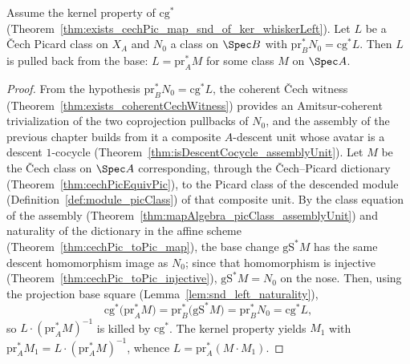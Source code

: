 \begin{theorem}
  \label{thm:exists_cechPic_map_snd_eq_of_ker}
  \leanok
  Assume the kernel property of \(\mathrm{cg}^{*}\) (Theorem~\ref{thm:exists_cechPic_map_snd_of_ker_whiskerLeft}).
  Let \(L\) be a \v Cech Picard class on \(X_A\) and \(N_0\) a class on \(\Spec B\) with
  \(\mathrm{pr}_B^{*} N_0 = \mathrm{cg}^{*} L\).  Then \(L\) is pulled back from the base:
  \(L = \mathrm{pr}_A^{*} M\) for some class \(M\) on \(\Spec A\).
\end{theorem}
\begin{proof}
  \leanok
  From the hypothesis \(\mathrm{pr}_B^{*} N_0 = \mathrm{cg}^{*} L\), the coherent \v Cech witness
  (Theorem~\ref{thm:exists_coherentCechWitness}) provides an Amitsur-coherent trivialization of
  the two coprojection pullbacks of \(N_0\), and the assembly of the previous chapter builds from
  it a composite \(A\)-descent unit whose avatar is a descent \(1\)-cocycle
  (Theorem~\ref{thm:isDescentCocycle_assemblyUnit}).  Let \(M\) be the \v Cech class on \(\Spec
  A\) corresponding, through the \v Cech–Picard dictionary
  (Theorem~\ref{thm:cechPicEquivPic}), to the Picard class of the descended module
  (Definition~\ref{def:module_picClass}) of that composite unit.  By the class equation of the
  assembly (Theorem~\ref{thm:mapAlgebra_picClass_assemblyUnit}) and naturality of the dictionary
  in the affine scheme (Theorem~\ref{thm:cechPic_toPic_map}), the base change \(\mathrm{gS}^{*}
  M\) has the same descent homomorphism image as \(N_0\); since that homomorphism is injective
  (Theorem~\ref{thm:cechPic_toPic_injective}), \(\mathrm{gS}^{*} M = N_0\) on the nose.  Then,
  using the projection base square (Lemma~\ref{lem:snd_left_naturality}),
  \[
    \mathrm{cg}^{*}\bigl(\mathrm{pr}_A^{*} M\bigr) = \mathrm{pr}_B^{*}\bigl(\mathrm{gS}^{*} M\bigr)
      = \mathrm{pr}_B^{*} N_0 = \mathrm{cg}^{*} L ,
  \]
  so \(L \cdot (\mathrm{pr}_A^{*} M)^{-1}\) is killed by \(\mathrm{cg}^{*}\).  The kernel
  property yields \(M_1\) with \(\mathrm{pr}_A^{*} M_1 = L \cdot (\mathrm{pr}_A^{*} M)^{-1}\),
  whence \(L = \mathrm{pr}_A^{*}(M \cdot M_1)\).
\end{proof}

